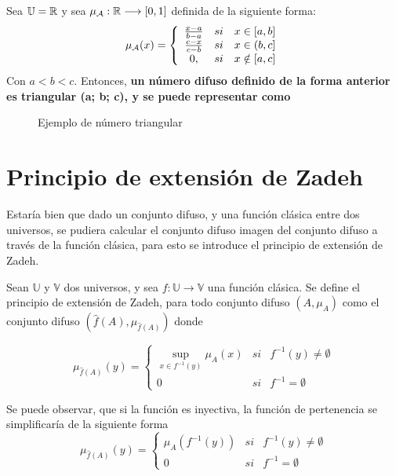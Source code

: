   \begin{ejemplo}
    Sea $\mathbb U=\mathbb R$ y sea $\mu_\mathcal{A}: \mathbb R \longrightarrow [0, 1]$ definida de la siguiente forma:
    $$
    \mu_\mathcal{A}(x)=\left\{
    \begin{array}{c c c}
      \frac{x-a}{b-a} & si & x \in [a, b] \\
      \frac{c-x}{c-b} & si & x \in (b, c] \\
	0, & si & x \notin [a, c]
    \end{array}
    \right.
    $$
    Con $a < b < c$. Entonces, \textbf{un número difuso definido de la forma anterior es triangular (a; b; c), y se puede representar como} 
    
    \begin{figure}[h]
      \centering
      \caption{Ejemplo de número triangular}
      \label{fig:numero_difuso}
    \end{figure}
    
  \end{ejemplo}


  \section{Principio de extensión de Zadeh}
  Estaría bien que dado un conjunto difuso, y una función clásica entre dos universos, se pudiera calcular el conjunto difuso imagen del conjunto difuso a través de la función clásica, para esto se introduce el principio de extensión de Zadeh.

  \begin{definicion}
  	\label{def:zadeh}
    Sean $\mathbb{U}$ y $\mathbb{V}$ dos universos, y sea $f: \mathbb{U} \longrightarrow \mathbb{V}$ una función clásica. Se define el principio de extensión de Zadeh, para todo conjunto difuso $(A, \mu_A)$ como el conjunto difuso $(\hat{f}(A), \mu_{\hat{f}(A)})$ donde
    
    $$
    \mu_{\hat{f}(A)}(y)=\left\{
    \begin{array}{ccc}
      \sup_{x\in f^{-1}(y)} \mu_A(x) & si & f^{-1}(y)\neq\emptyset\\
      0 & si & f^{-1}=\emptyset
    \end{array}
    \right.
    $$
  \end{definicion}


  Se puede observar, que si la función es inyectiva, la función de pertenencia se simplificaría de la siguiente forma
  $$
  \mu_{\hat{f}(A)}(y)=\left\{
  \begin{array}{ccc}
    \mu_A(f^{-1}(y)) & si & f^{-1}(y)\neq\emptyset\\
    0 & si & f^{-1}=\emptyset
  \end{array}
  \right.
  $$

